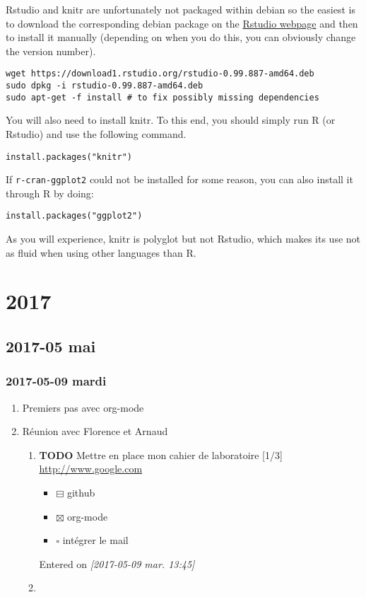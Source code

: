 \documentclass[11pt]{article}
\begin{document}
\begin{enumerate}
\begin{enumerate}
Rstudio and knitr are unfortunately not packaged within debian so the
easiest is to download the corresponding debian package on the \href{http://www.rstudio.com/ide/download/desktop}{Rstudio
webpage} and then to install it manually (depending on when you do
this, you can obviously change the version number).
\begin{verbatim}
wget https://download1.rstudio.org/rstudio-0.99.887-amd64.deb
sudo dpkg -i rstudio-0.99.887-amd64.deb
sudo apt-get -f install # to fix possibly missing dependencies
\end{verbatim}
You will also need to install knitr. To this end, you should simply
run R (or Rstudio) and use the following command.
\begin{verbatim}
install.packages("knitr")
\end{verbatim}
If \texttt{r-cran-ggplot2} could not be installed for some reason, you can also
install it through R by doing:
\begin{verbatim}
install.packages("ggplot2")
\end{verbatim}

As you will experience, knitr is polyglot but not Rstudio, which
makes its use not as fluid when using other languages than R.
\end{enumerate}
\end{enumerate}
\section{2017}
\label{sec:orgcaff67a}
\subsection{2017-05 mai}
\label{sec:org52dea03}
\subsubsection{2017-05-09 mardi}
\label{sec:org58ae459}
\begin{enumerate}
\item Premiers pas avec org-mode
\label{sec:org58ccbe8}
\item Réunion avec Florence et Arnaud
\label{sec:org0e9e98a}
\begin{enumerate}
\item {\bfseries\sffamily TODO} Mettre en place mon cahier de laboratoire [1/3]
\label{sec:org1c6f0bf}
\url{http://www.google.com}
\begin{itemize}
\item $\boxminus$ github
\item $\boxtimes$ org-mode
\item $\square$ intégrer le mail
\end{itemize}

Entered on \textit{[2017-05-09 mar. 13:45]}
\item 
\label{sec:org29681dd}
\end{enumerate}
\end{enumerate}
\end{document}
